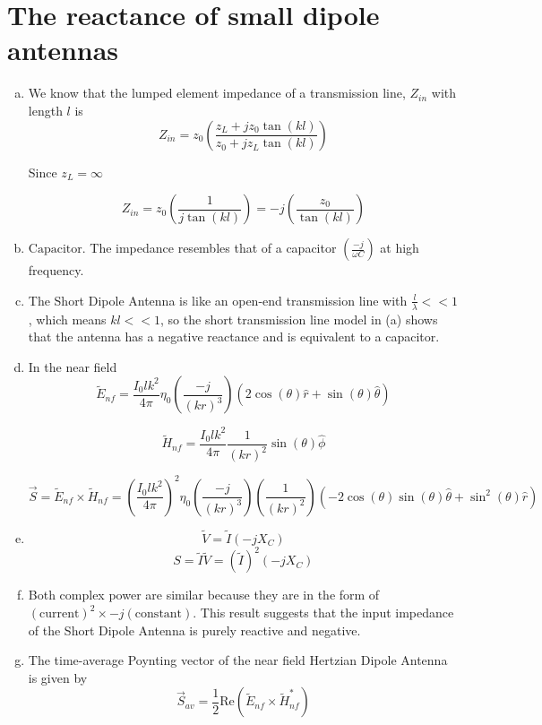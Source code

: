 \documentclass{article} %
\begin{document}
\section{The reactance of small dipole antennas}
\begin{enumerate}[(a)]
      \item We know that the lumped element impedance of a transmission line, $Z_{in}$ with length $l$ is
            \[Z_{in} = z_0\left(\frac{z_L + j z_0 \tan(k l)}{z_0 + j z_L \tan(kl)}\right)\]

            Since $z_L = \infty$

            \[Z_{in} = z_0 \left(\frac{1}{j \tan(kl)}\right) = \boxed{-j \left(\frac{z_0}{\tan(kl)}\right)}\]
      \item $\boxed{\text{Capacitor}}$. The impedance resembles that of a capacitor $\left(\frac{-j}{\omega C}\right)$ at high frequency.
      \item The Short Dipole Antenna is like an open-end transmission line with $\frac{l}{\lambda} << 1$, which means $kl << 1$, so the short transmission line model in (a) shows that the antenna has a negative reactance and is equivalent to a capacitor.
      \item In the near field
            \[\widetilde{E}_{nf} = \frac{I_0 l k^2}{4\pi} \eta_0 \left(\frac{-j}{(kr)^3}\right)(2 \cos(\theta) \hat{r} + \sin(\theta) \hat{\theta})\]

            \[\widetilde{H}_{nf} = \frac{I_0 l k^2}{4\pi} \frac{1}{(kr)^2} \sin(\theta) \hat{\phi}\]

            \[\vec{S} = \widetilde{E}_{nf} \times \widetilde{H}_{nf} = \boxed{\left(\frac{I_0 l k^2}{4\pi}\right)^2 \eta_0 \left(\frac{-j}{(kr)^3}\right)\left(\frac{1}{(kr)^2}\right) (-2 \cos(\theta)\sin(\theta) \hat{\theta} + \sin^2(\theta) \hat{r})}\]
      \item
            \[\widetilde{V} = \widetilde{I}(-jX_C)\]
            \[S = \widetilde{I}\widetilde{V} = \boxed{(\widetilde{I})^2 (-jX_C)}\]
      \item Both complex power are similar because they are in the form of $(\text{current})^2 \times -j (\text{constant})$. This result suggests that the input impedance of the Short Dipole Antenna is purely reactive and negative.
      \item The time-average Poynting vector of the near field Hertzian Dipole Antenna is given by
            \[\vec{S}_{av} = \frac{1}{2}\text{Re}(\widetilde{E}_{nf} \times \widetilde{H}_{nf}^{*})\]


\end{enumerate}
\end{document}
